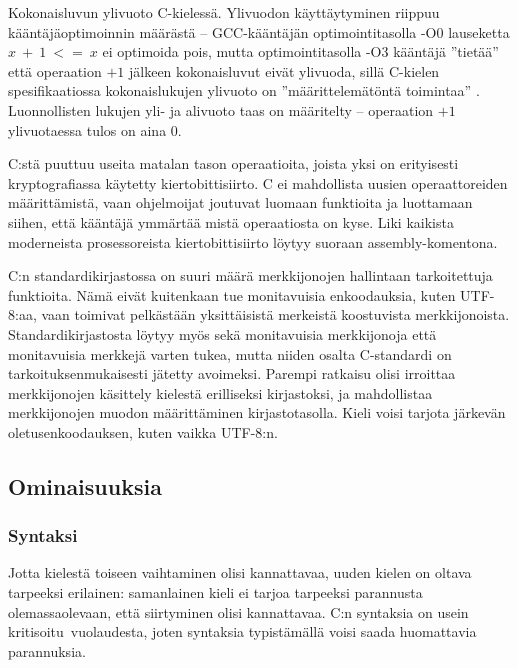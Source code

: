 \begin{listing}[ht!]
    \inputminted{C}{c-overflow.c}
    \inputminted{text}{c-overflow-output.txt}

    \caption{Kokonaisluvun ylivuoto C-kielessä. Ylivuodon käyttäytyminen
    riippuu kääntäjäoptimoinnin määrästä -- GCC-kääntäjän optimointitasolla -O0
    lauseketta $x~+~1~<=~x$ ei optimoida pois, mutta optimointitasolla -O3
    kääntäjä ''tietää'' että operaation $+1$ jälkeen kokonaisluvut eivät
    ylivuoda, sillä C-kielen spesifikaatiossa kokonaislukujen ylivuoto on
    ''määrittelemätöntä toimintaa'' .
    Luonnollisten lukujen yli- ja alivuoto taas on määritelty -- operaation
    $+1$ ylivuotaessa tulos on aina $0$.}
    \label{fig:coverflow}
\end{listing}

C:stä puuttuu useita matalan tason operaatioita, joista yksi on erityisesti
kryptografiassa käytetty kiertobittisiirto. C ei
mahdollista uusien operaattoreiden määrittämistä, vaan ohjelmoijat joutuvat 
luomaan funktioita ja luottamaan siihen, että kääntäjä ymmärtää mistä
operaatiosta on kyse. Liki kaikista moderneista prosessoreista
kiertobittisiirto löytyy suoraan assembly-komentona.

C:n standardikirjastossa on suuri määrä merkkijonojen hallintaan tarkoitettuja
funktioita. Nämä eivät kuitenkaan tue monitavuisia enkoodauksia, kuten
UTF-8:aa, vaan toimivat pelkästään yksittäisistä merkeistä koostuvista
merkkijonoista. Standardikirjastosta löytyy myös sekä monitavuisia merkkijonoja
että monitavuisia merkkejä varten tukea, mutta niiden osalta C-standardi on
tarkoituksenmukaisesti jätetty avoimeksi. Parempi ratkaisu olisi irroittaa
merkkijonojen käsittely kielestä erilliseksi kirjastoksi, ja mahdollistaa
merkkijonojen muodon määrittäminen kirjastotasolla. Kieli voisi tarjota
järkevän oletusenkoodauksen, kuten vaikka UTF-8:n.

\subsection{Ominaisuuksia}

\subsubsection{Syntaksi}

Jotta kielestä toiseen vaihtaminen olisi kannattavaa, uuden kielen on oltava
tarpeeksi erilainen: samanlainen kieli ei tarjoa tarpeeksi parannusta
olemassaolevaan, että siirtyminen olisi kannattavaa. C:n syntaksia on usein
kritisoitu\citationneeded~vuolaudesta, joten syntaksia typistämällä voisi saada
huomattavia parannuksia.

